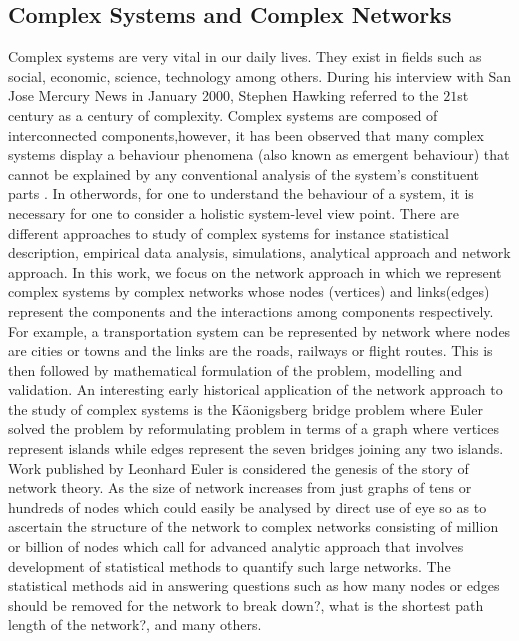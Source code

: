 \documentclass[10pt,a4paper]{article}
\theoremstyle{plain}
\theoremstyle{definition}
\begin{document}
\subsection{Complex Systems and Complex Networks}
Complex systems are very vital in our daily lives. They exist in fields such as social, economic, science, technology among others.  During his interview with San Jose Mercury News in January 2000, Stephen Hawking referred to the $21$st century as a century of complexity. Complex systems are composed of interconnected components,however, it has been observed that many complex systems display a behaviour phenomena (also known as emergent behaviour) that cannot be explained by any conventional analysis of the system's constituent parts \citep{EncyBrit}. In otherwords, for one to understand the behaviour of a system, it is necessary for one to consider a holistic system-level view point.  There are different approaches to study of complex systems for instance statistical description, empirical data analysis, simulations, analytical approach and network approach. In this work, we focus on the network approach in which we represent complex systems by complex networks whose nodes (vertices) and links(edges) represent the components and the interactions among components respectively.  For example, a transportation system can be represented by network where nodes are cities or towns and the links are the roads, railways or flight routes. This is then followed by mathematical formulation of the problem, modelling and validation.  
An interesting early historical application of the network approach to the study of complex systems is the K\"{a}onigsberg bridge problem where Euler \citep{euler1976solution,euler1953leonhard} solved the problem by reformulating problem in terms of a graph where vertices represent islands while edges represent the seven bridges joining any two islands. Work published by Leonhard Euler \citep{euler1976solution} is considered the genesis of the story of network theory.
As the size of network increases from just graphs of tens or hundreds of nodes which could easily be analysed by direct use of eye so as to ascertain the structure of the network  to complex networks consisting of million or billion of nodes which call for advanced analytic approach that involves development of statistical methods to quantify such large networks. The statistical methods aid in answering questions such as how many nodes or edges should be removed for the network to break down?, what is the shortest path length of the network?, and many others. 
\end{document}
